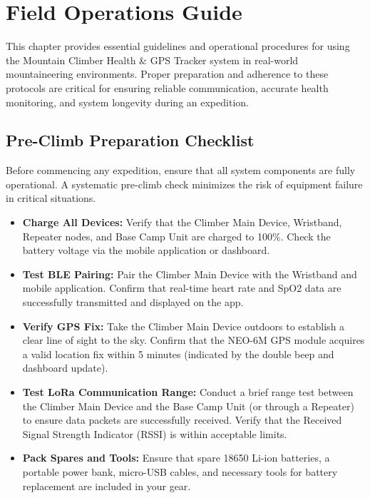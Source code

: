 \chapter{Field Operations Guide}
\label{ch:field-operations}

This chapter provides essential guidelines and operational procedures for using the Mountain Climber Health \& GPS Tracker system in real-world mountaineering environments. Proper preparation and adherence to these protocols are critical for ensuring reliable communication, accurate health monitoring, and system longevity during an expedition.

\section{Pre-Climb Preparation Checklist}
\label{sec:pre-climb-checklist}

Before commencing any expedition, ensure that all system components are fully operational. A systematic pre-climb check minimizes the risk of equipment failure in critical situations.

\begin{itemize}
    \item \textbf{Charge All Devices:} Verify that the Climber Main Device, Wristband, Repeater nodes, and Base Camp Unit are charged to 100\%. Check the battery voltage via the mobile application or dashboard.
    \item \textbf{Test BLE Pairing:} Pair the Climber Main Device with the Wristband and mobile application. Confirm that real-time heart rate and SpO2 data are successfully transmitted and displayed on the app.
    \item \textbf{Verify GPS Fix:} Take the Climber Main Device outdoors to establish a clear line of sight to the sky. Confirm that the NEO-6M GPS module acquires a valid location fix within 5 minutes (indicated by the double beep and dashboard update).
    \item \textbf{Test LoRa Communication Range:} Conduct a brief range test between the Climber Main Device and the Base Camp Unit (or through a Repeater) to ensure data packets are successfully received. Verify that the Received Signal Strength Indicator (RSSI) is within acceptable limits.
    \item \textbf{Pack Spares and Tools:} Ensure that spare 18650 Li-ion batteries, a portable power bank, micro-USB cables, and necessary tools for battery replacement are included in your gear.
\end{itemize}

